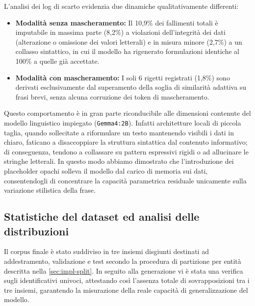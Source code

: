 \documentclass[12pt,a4paper,openright,twoside]{book}
\begin{document}
L'analisi dei log di scarto evidenzia due dinamiche qualitativamente differenti:
\begin{itemize}
    \item \textbf{Modalità senza mascheramento:} Il 10,9\% dei fallimenti totali
          è imputabile in massima parte (8,2\%) a violazioni dell'integrità dei
          dati (alterazione o omissione dei valori letterali) e in misura minore
          (2,7\%) a un collasso sintattico, in cui il modello ha rigenerato
          formulazioni identiche al 100\% a quelle già accettate.
    \item \textbf{Modalità con mascheramento:} I soli 6 rigetti registrati
          (1,8\%) sono derivati esclusivamente dal superamento della soglia di
          similarità adattiva su frasi brevi, senza alcuna corruzione dei token
          di mascheramento.
\end{itemize}

Questo comportamento è in gran parte riconducibile alle dimensioni contenute del
modello linguistico impiegato (\texttt{Gemma4:2B}). Infatti architetture locali
di piccola taglia, quando sollecitate a riformulare un testo mantenendo visibili
i dati in chiaro, faticano a disaccoppiare la struttura sintattica dal contenuto
informativo; di conseguenza, tendono a collassare su pattern espressivi rigidi o
ad allucinare le stringhe letterali. In questo modo abbiamo dimostrato che
l'introduzione dei placeholder opachi solleva il modello dal carico di memoria
sui dati, consentendogli di concentrare la capacità parametrica residuale
unicamente sulla variazione stilistica della frase.

\subsection{Statistiche del dataset ed analisi delle distribuzioni}
\label{sec:eval-dataset-stats}

Il corpus finale è stato suddiviso in tre insiemi disgiunti destinati ad
addestramento, validazione e test secondo la procedura di partizione per entità
descritta nella \cref{sec:impl-split}. In seguito alla generazione vi è stata
una verifica sugli identificativi univoci, attestando così l'assenza totale di
sovrapposizioni tra i tre insiemi, garantendo la misurazione della reale
capacità di generalizzazione del modello.
\end{document}
